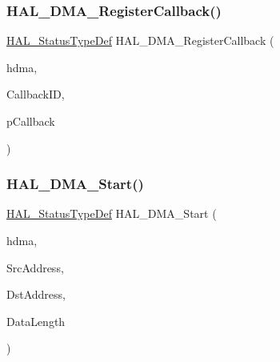 \mbox{\label{group___d_m_a___exported___functions___group2_gaabec77de08a59c94f2c6265ce7ae8261}} 
\subsubsection{\texorpdfstring{H\+A\+L\+\_\+\+D\+M\+A\+\_\+\+Register\+Callback()}{HAL\_DMA\_RegisterCallback()}}
{\footnotesize\ttfamily \hyperlink{stm32f4xx__hal__def_8h_a63c0679d1cb8b8c684fbb0632743478f}{H\+A\+L\+\_\+\+Status\+Type\+Def} H\+A\+L\+\_\+\+D\+M\+A\+\_\+\+Register\+Callback (\begin{DoxyParamCaption}\item[{\hyperlink{group___d_m_a___exported___types_ga41b754a906b86bce54dc79938970138b}{D\+M\+A\+\_\+\+Handle\+Type\+Def} $\ast$}]{hdma,  }\item[{\hyperlink{group___d_m_a___exported___types_gafbe8b2bd9ce2128de6cdc08ccde7e8ad}{H\+A\+L\+\_\+\+D\+M\+A\+\_\+\+Callback\+I\+D\+Type\+Def}}]{Callback\+ID,  }\item[{void($\ast$)(\hyperlink{group___d_m_a___exported___types_ga41b754a906b86bce54dc79938970138b}{D\+M\+A\+\_\+\+Handle\+Type\+Def} $\ast$\+\_\+hdma)}]{p\+Callback }\end{DoxyParamCaption})}

\mbox{\label{group___d_m_a___exported___functions___group2_ga96fbd9c285135f558fd9283a57406330}} 
\subsubsection{\texorpdfstring{H\+A\+L\+\_\+\+D\+M\+A\+\_\+\+Start()}{HAL\_DMA\_Start()}}
{\footnotesize\ttfamily \hyperlink{stm32f4xx__hal__def_8h_a63c0679d1cb8b8c684fbb0632743478f}{H\+A\+L\+\_\+\+Status\+Type\+Def} H\+A\+L\+\_\+\+D\+M\+A\+\_\+\+Start (\begin{DoxyParamCaption}\item[{\hyperlink{group___d_m_a___exported___types_ga41b754a906b86bce54dc79938970138b}{D\+M\+A\+\_\+\+Handle\+Type\+Def} $\ast$}]{hdma,  }\item[{uint32\+\_\+t}]{Src\+Address,  }\item[{uint32\+\_\+t}]{Dst\+Address,  }\item[{uint32\+\_\+t}]{Data\+Length }\end{DoxyParamCaption})}

